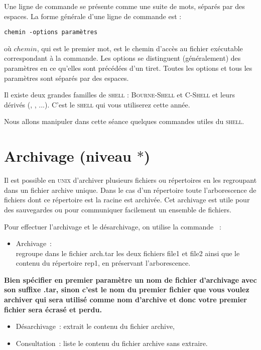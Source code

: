 \documentclass[a4paper,11pt]{article}
\newcommand{\unix}{\textsc{unix}}
\newcommand{\shell}{\textsc{shell}}
\begin{document}
Une ligne de commande se présente comme une suite de mots, séparés par des
espaces. La forme générale d'une ligne de commande est :

 \verb!chemin -options paramètres!
 
où $chemin$, qui est le premier mot, est le chemin d'accès au fichier
exécutable correspondant à la commande. Les options se distinguent
(généralement) des paramètres en ce qu'elles sont précédées d'un tiret.
Toutes les options et tous les paramètres sont séparés par des espaces.

Il existe deux grandes familles de \shell{} : \textsc{Bourne-Shell}  et
\textsc{C-Shell}  et leurs dérivés (, , ...).
C'est le \shell{}  qui vous utiliserez cette année.

Nous allons manipuler dans cette séance quelques commandes utiles du
\shell{}.

\section{Archivage (niveau $*$)}

Il est possible en \unix{} d'archiver plusieurs fichiers ou répertoires
en les regroupant dans un fichier archive unique.
Dans le cas d'un répertoire toute l'arborescence de fichiers dont ce
répertoire est la racine est archivée.
Cet archivage est utile pour des sauvegardes ou pour communiquer facilement un
ensemble de fichiers.

Pour effectuer l'archivage et le désarchivage, on utilise la commande
 :

\begin{itemize}
  \item Archivage :  \\
        regroupe dans le fichier arch.tar les deux fichiers file1 et file2
        ainsi que le contenu du répertoire rep1, en préservant
        l'arborescence.
\end{itemize}

\begin{danger}
\textbf{Bien spécifier en premier paramètre un nom de fichier d'archivage avec
son suffixe .tar, sinon c'est le nom du premier fichier que vous voulez
archiver qui sera utilisé comme nom d'archive et donc votre premier fichier
sera écrasé et perdu.}
\end{danger}

\begin{itemize}
  \item Désarchivage :  extrait le contenu du fichier
        archive,
  \item Consultation :  liste le contenu du
        fichier archive sans extraire.
\end{itemize}
\end{document}
